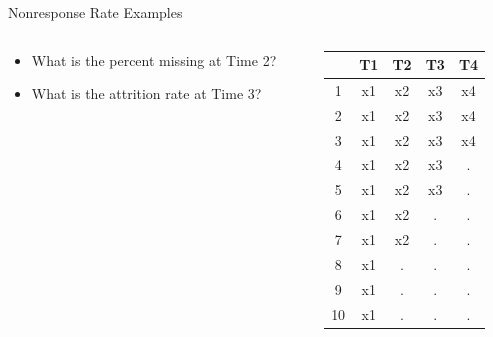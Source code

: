 \documentclass{beamer}\usepackage[]{graphicx}\usepackage[]{color}
\begin{document}

\begin{frame}{Nonresponse Rate Examples}
  
  \begin{columns}
    \begin{column}{0.5\textwidth}
      
      \begin{itemize}
        \item What is the percent missing at Time 2?
          \vc
        \item What is the attrition rate at Time 3?
      \end{itemize}
      
    \end{column}
    \begin{column}{0.5\textwidth}
      
\begin{table}[ht]
\centering
\begin{tabular}{ccccc}
  \toprule
 & T1 & T2 & T3 & T4 \\ 
  \midrule
1 & x1 & x2 & x3 & x4 \\ 
  2 & x1 & x2 & x3 & x4 \\ 
  3 & x1 & x2 & x3 & x4 \\ 
  4 & x1 & x2 & x3 & . \\ 
  5 & x1 & x2 & x3 & . \\ 
  6 & x1 & x2 & . & . \\ 
  7 & x1 & x2 & . & . \\ 
  8 & x1 & . & . & . \\ 
  9 & x1 & . & . & . \\ 
  10 & x1 & . & . & . \\ 
   \bottomrule
\end{tabular}
\end{table}


\end{column}
\end{columns}

\end{frame}

\watermarkon %


\end{document}
